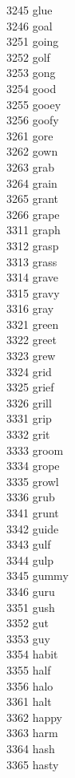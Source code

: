 3245 glue \\
3246 goal \\
3251 going \\
3252 golf \\
3253 gong \\
3254 good \\
3255 gooey \\
3256 goofy \\
3261 gore \\
3262 gown \\
3263 grab \\
3264 grain \\
3265 grant \\
3266 grape \\
3311 graph \\
3312 grasp \\
3313 grass \\
3314 grave \\
3315 gravy \\
3316 gray \\
3321 green \\
3322 greet \\
3323 grew \\
3324 grid \\
3325 grief \\
3326 grill \\
3331 grip \\
3332 grit \\
3333 groom \\
3334 grope \\
3335 growl \\
3336 grub \\
3341 grunt \\
3342 guide \\
3343 gulf \\
3344 gulp \\
3345 gummy \\
3346 guru \\
3351 gush \\
3352 gut \\
3353 guy \\
3354 habit \\
3355 half \\
3356 halo \\
3361 halt \\
3362 happy \\
3363 harm \\
3364 hash \\
3365 hasty \\
